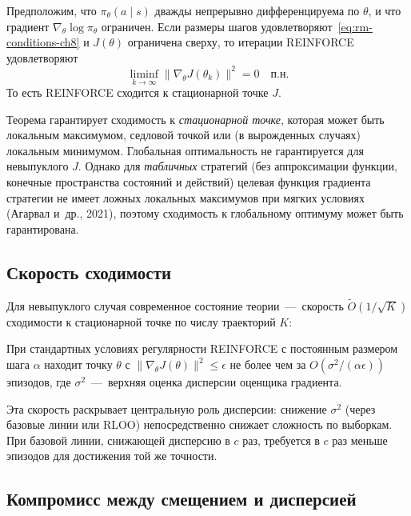 \begin{theorem}
\label{thm:reinforce-convergence}
Предположим, что $\pi_\theta(a \mid s)$ дважды непрерывно дифференцируема по $\theta$, и что градиент $\nabla_\theta \log \pi_\theta$ ограничен. Если размеры шагов удовлетворяют~\eqref{eq:rm-conditions-ch8} и $J(\theta)$ ограничена сверху, то итерации REINFORCE удовлетворяют
\[
\liminf_{k \to \infty} \|\nabla_\theta J(\theta_k)\|^2 = 0 \quad \mbox{п.н.}
\]
То есть REINFORCE сходится к стационарной точке $J$.
\end{theorem}

Теорема гарантирует сходимость к \emph{стационарной точке}, которая может быть локальным максимумом, седловой точкой или (в вырожденных случаях) локальным минимумом. Глобальная оптимальность не гарантируется для невыпуклого $J$. Однако для \emph{табличных} стратегий (без аппроксимации функции, конечные пространства состояний и действий) целевая функция градиента стратегии не имеет ложных локальных максимумов при мягких условиях (Агарвал и~др., 2021), поэтому сходимость к глобальному оптимуму может быть гарантирована.

\subsection{Скорость сходимости}

Для невыпуклого случая современное состояние теории \,---\, скорость $\tilde O(1/\sqrt{K})$ сходимости к стационарной точке по числу траекторий $K$:

\begin{theorem}
\label{thm:reinforce-rate}
При стандартных условиях регулярности REINFORCE с постоянным размером шага $\alpha$ находит точку $\theta$ с $\|\nabla_\theta J(\theta)\|^2 \leq \epsilon$ не более чем за $O(\sigma^2 / (\alpha \epsilon))$ эпизодов, где $\sigma^2$ \,---\, верхняя оценка дисперсии оценщика градиента.
\end{theorem}

Эта скорость раскрывает центральную роль дисперсии: снижение $\sigma^2$ (через базовые линии или RLOO) непосредственно снижает сложность по выборкам. При базовой линии, снижающей дисперсию в $c$ раз, требуется в $c$ раз меньше эпизодов для достижения той же точности.

\subsection{Компромисс между смещением и дисперсией}

